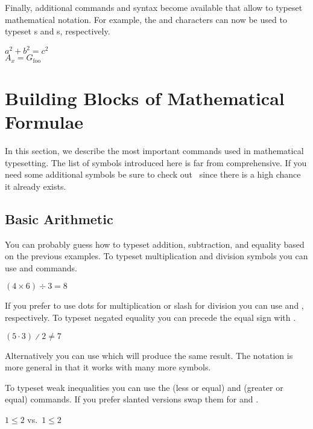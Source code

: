 Finally, additional commands and syntax become available that allow to typeset
mathematical notation. For example, the \ai{\^{}} and \ai{\_} characters can
now be used to typeset s and s, respectively.
\begin{example}
\( a^2 + b^2 = c^2 \) \\
\( A_x = G_{\text{foo}} \)
\end{example}

\section{Building Blocks of Mathematical Formulae}

In this section, we describe the most important commands used in mathematical
typesetting. The list of symbols introduced here is far from comprehensive. If
you need some additional symbols be sure to check out~\cite{detexify,
  unicode-math-symbols, latexcomp} since there is a high chance it already
exists.

\subsection{Basic Arithmetic}

You can probably guess how to typeset addition, subtraction, and equality based
on the previous examples. To typeset multiplication and division symbols you can
use  and  commands.
\begin{example}
\( (4 \times 6) \div 3 = 8 \)
\end{example}
If you prefer to use dots for multiplication or slash for division you can use
 and , respectively. To typeset negated equality you can
precede the equal sign with .
\begin{example}
\( (5 \cdot 3) \divslash 2
  \not= 7 \)
\end{example}
Alternatively you can use  which will produce the same result. The
 notation is more general in that it works with many more symbols.

To typeset weak inequalities you can use the  (less or equal) and
 (greater or equal) commands. If you prefer slanted versions swap them
for  and .
\begin{example}
\( 1 \leq 2 \) vs.\ 
\(1 \leqslant 2\)
\end{example}


